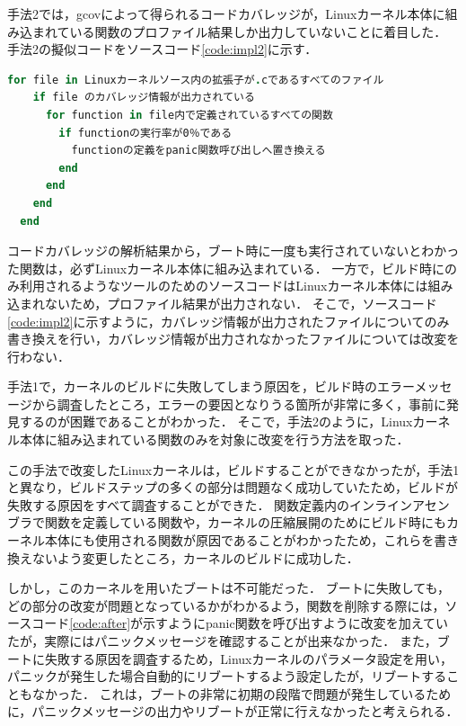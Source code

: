 \documentclass[graduation-thesis]{mlarticle}
\begin{document}
手法2では，gcovによって得られるコードカバレッジが，Linuxカーネル本体に組み込まれている関数のプロファイル結果しか出力していないことに着目した．
手法2の擬似コードをソースコード\ref{code:impl2}に示す．

\begin{lstlisting}[language=ruby, caption=手法2の擬似コード, label=code:impl2]
  for file in Linuxカーネルソース内の拡張子が.cであるすべてのファイル
    if file のカバレッジ情報が出力されている
      for function in file内で定義されているすべての関数
        if functionの実行率が0％である
          functionの定義をpanic関数呼び出しへ置き換える
        end
      end
    end
  end
\end{lstlisting}

コードカバレッジの解析結果から，ブート時に一度も実行されていないとわかった関数は，必ずLinuxカーネル本体に組み込まれている．
一方で，ビルド時にのみ利用されるようなツールのためのソースコードはLinuxカーネル本体には組み込まれないため，プロファイル結果が出力されない．
そこで，ソースコード\ref{code:impl2}に示すように，カバレッジ情報が出力されたファイルについてのみ書き換えを行い，カバレッジ情報が出力されなかったファイルについては改変を行わない．

手法1で，カーネルのビルドに失敗してしまう原因を，ビルド時のエラーメッセージから調査したところ，エラーの要因となりうる箇所が非常に多く，事前に発見するのが困難であることがわかった．
そこで，手法2のように，Linuxカーネル本体に組み込まれている関数のみを対象に改変を行う方法を取った．

この手法で改変したLinuxカーネルは，ビルドすることができなかったが，手法1と異なり，ビルドステップの多くの部分は問題なく成功していたため，ビルドが失敗する原因をすべて調査することができた．
関数定義内のインラインアセンブラで関数を定義している関数や，カーネルの圧縮展開のためにビルド時にもカーネル本体にも使用される関数が原因であることがわかったため，これらを書き換えないよう変更したところ，カーネルのビルドに成功した．

しかし，このカーネルを用いたブートは不可能だった．
ブートに失敗しても，どの部分の改変が問題となっているかがわかるよう，関数を削除する際には，ソースコード\ref{code:after}が示すようにpanic関数を呼び出すように改変を加えていたが，実際にはパニックメッセージを確認することが出来なかった．
また，ブートに失敗する原因を調査するため，Linuxカーネルのパラメータ設定を用い，パニックが発生した場合自動的にリブートするよう設定したが，リブートすることもなかった．
これは，ブートの非常に初期の段階で問題が発生しているために，パニックメッセージの出力やリブートが正常に行えなかったと考えられる．
\end{document}
